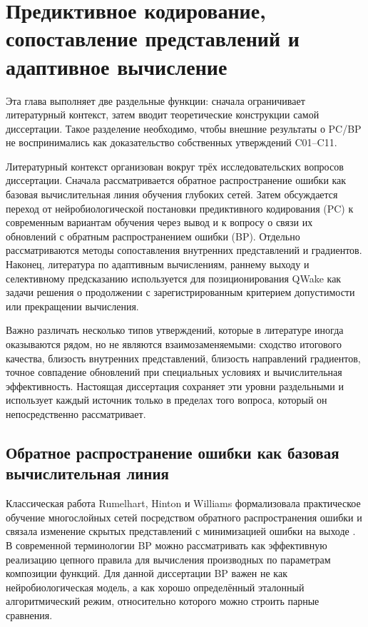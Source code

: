 \chapter{Предиктивное кодирование, сопоставление представлений и адаптивное вычисление}
\label{ch:related-work}

Эта глава выполняет две раздельные функции: сначала ограничивает литературный
контекст, затем вводит теоретические конструкции самой диссертации. Такое
разделение необходимо, чтобы внешние результаты о PC/BP не воспринимались как
доказательство собственных утверждений C01--C11.

Литературный контекст организован вокруг трёх исследовательских вопросов
диссертации. Сначала рассматривается обратное распространение ошибки как
базовая вычислительная линия обучения глубоких сетей. Затем обсуждается переход
от нейробиологической постановки предиктивного кодирования (PC) к современным
вариантам обучения через вывод и к вопросу о связи их обновлений с обратным
распространением ошибки (BP). Отдельно рассматриваются методы сопоставления
внутренних представлений и градиентов. Наконец, литература по адаптивным
вычислениям, раннему выходу и селективному предсказанию используется для
позиционирования QWake как задачи решения о продолжении с зарегистрированным критерием допустимости или
прекращении вычисления.

Важно различать несколько типов утверждений, которые в литературе иногда
оказываются рядом, но не являются взаимозаменяемыми: сходство итогового
качества, близость внутренних представлений, близость направлений градиентов,
точное совпадение обновлений при специальных условиях и вычислительная
эффективность. Настоящая диссертация сохраняет эти уровни раздельными и
использует каждый источник только в пределах того вопроса, который он
непосредственно рассматривает.

\section{Обратное распространение ошибки как базовая вычислительная линия}
\label{sec:related-bp}

Классическая работа Rumelhart, Hinton и Williams формализовала практическое
обучение многослойных сетей посредством обратного распространения ошибки и
связала изменение скрытых представлений с минимизацией ошибки на выходе
\cite{rumelhart1986backprop}. В современной терминологии BP можно рассматривать
как эффективную реализацию цепного правила для вычисления производных по
параметрам композиции функций. Для данной диссертации BP важен не как
нейробиологическая модель, а как хорошо определённый эталонный алгоритмический
режим, относительно которого можно строить парные сравнения.


